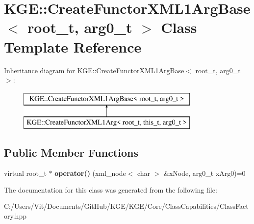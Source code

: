 \hypertarget{class_k_g_e_1_1_create_functor_x_m_l1_arg_base}{\section{K\-G\-E\-:\-:Create\-Functor\-X\-M\-L1\-Arg\-Base$<$ root\-\_\-t, arg0\-\_\-t $>$ Class Template Reference}
\label{class_k_g_e_1_1_create_functor_x_m_l1_arg_base}
}
Inheritance diagram for K\-G\-E\-:\-:Create\-Functor\-X\-M\-L1\-Arg\-Base$<$ root\-\_\-t, arg0\-\_\-t $>$\-:\begin{figure}[H]
\begin{center}
\leavevmode
\includegraphics[height=2.000000cm]{class_k_g_e_1_1_create_functor_x_m_l1_arg_base}
\end{center}
\end{figure}
\subsection*{Public Member Functions}
\begin{DoxyCompactItemize}
\item 
\hypertarget{class_k_g_e_1_1_create_functor_x_m_l1_arg_base_a4a9ee65f7b8a81db6b7148ff42cd87bb}{virtual root\-\_\-t $\ast$ {\bfseries operator()} (xml\-\_\-node$<$ char $>$ \&x\-Node, arg0\-\_\-t x\-Arg0)=0}\label{class_k_g_e_1_1_create_functor_x_m_l1_arg_base_a4a9ee65f7b8a81db6b7148ff42cd87bb}

\end{DoxyCompactItemize}


The documentation for this class was generated from the following file\-:\begin{DoxyCompactItemize}
\item 
C\-:/\-Users/\-Vit/\-Documents/\-Git\-Hub/\-K\-G\-E/\-K\-G\-E/\-Core/\-Class\-Capabilities/Class\-Factory.\-hpp\end{DoxyCompactItemize}
